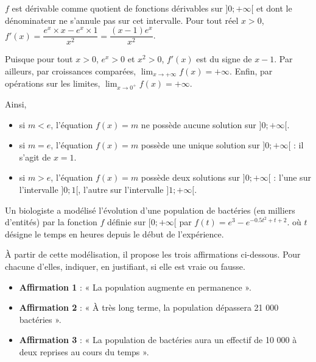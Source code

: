 \documentclass[11pt,fleqn, openany]{book} %
\begin{document}
\begin{solution}$f$ est dérivable comme quotient de fonctions dérivables sur $]0;+\infty[$ et dont le dénominateur ne s'annule pas sur cet intervalle. Pour tout réel $x>0$, $f'(x)=\dfrac{e^x \times x - e^x \times 1}{x^2}=\dfrac{(x-1)e^x}{x^2}$.

Puisque pour tout $x>0$, $e^x>0$ et $x^2>0$, $f'(x)$ est du signe de $x-1$. Par ailleurs, par croissances comparées, $\displaystyle\lim_{x\to +\infty}f(x)=+\infty$. Enfin, par opérations sur les limites, $\displaystyle\lim_{x\to 0^+}f(x)=+\infty$.

\begin{center}
\end{center}


Ainsi,
\begin{itemize}
\item si $m<e$, l'équation $f(x)=m$ ne possède aucune solution sur $]0;+\infty[$.
\item si $m=e$, l'équation $f(x)=m$ possède une unique solution sur $]0;+\infty[$ : il s'agit de $x=1$.
\item si $m>e$, l'équation $f(x)=m$ possède deux solutions sur $]0;+\infty[$ : l'une sur l'intervalle $]0;1[$, l'autre sur l'intervalle $]1;+\infty[$.
\end{itemize}
\end{solution}




\begin{exercise}[topic=cont03, subtitle={(Centres étrangers 2023)}]
Un biologiste a modélisé l'évolution d'une population de bactéries (en milliers d'entités) par la fonction $f$ définie sur $[0;+\infty[$ par $f(t)=e^3-e^{-0.5t^2+t+2}$. où $t$ désigne le temps en heures depuis le début de l'expérience.

À partir de cette modélisation, il propose les trois affirmations ci-dessous. Pour chacune d'elles, indiquer, en justifiant, si elle est vraie ou fausse.
\begin{itemize}
\item \textbf{Affirmation 1} : « La population augmente en permanence ».
\item \textbf{Affirmation 2} : « À très long terme, la population dépassera 21 000 bactéries ».
\item \textbf{Affirmation 3} : « La population de bactéries aura un effectif de 10 000 à deux reprises au cours du temps ».\end{itemize}
\end{exercise}
\end{document}
